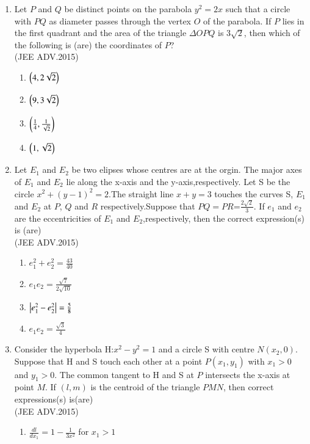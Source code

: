\documentclass[journal,12pt,twocolumn]{IEEEtran}
\theoremstyle{remark}
\begin{document}
\begin{enumerate}
	\item Let $P$ and $Q$ be distinct points on the parabola $y^2=2x$ such 
		that a circle with $PQ$ as diameter passes through the vertex
		$O$ of the parabola. If $P$ lies in the first quadrant and the area
		of the triangle  \(\Delta \)$OPQ$ is 3$\sqrt{2}$, then which of the following is
		(are) the coordinates of $P$? \\ 
		\hfill(JEE ADV.2015)
		\\
		\begin{enumerate}
			\item $ \left(4,2\sqrt{2}\right)$
			\item $\left(9,3\sqrt{2}\right)$
			\item $ \left(\frac{1}{4},\frac{1}{\sqrt{2}}\right)$
			\item  $ \left(1,\sqrt{2}\right)$
		\end{enumerate}
	\item Let $ E_1$  and $ E_2$ be two elipses whose centres are at the orgin.
              The major axes of $E_1$ and $ E_2$ lie along the x-axis and the
              y-axis,respectively. Let S be the circle $x^2+(y-1)^2=2$.The
		straight line $x+y=3$ touches the curves S, $E_1$ and $E_2$ at $P$, $Q$
		and $R$ respectively.Suppose that $PQ=PR$=$\frac{2\sqrt{2}}{3}$. If $e_1$ and
              $e_2$ are the eccentricities of $E_1$ and $E_2$,respectively, then the 
              correct expression(s) is (are) \\
		\hfill(JEE ADV.2015)
		\\
		\begin{enumerate}
			\item $e_1^2+e_2^2=\frac{43}{40}$
			\item $e_1e_2=\frac{\sqrt{7}}{2\sqrt{10}}$
			\item $\left\vert e_1^2-e_2^2\right\vert=\frac{5}{8}$
			\item $e_1e_2=\frac{\sqrt{3}}{4}$ 
		\end{enumerate}
	\item Consider the hyperbola H:$x^2-y^2=1$ and a circle S with 
		centre $N(x_2,0)$. Suppose that H and S touch each other at a 
	      point $P(x_1,y_1)$ with $x_1>0$ and $y_1>0$. The common tangent to H and S at $P$ intersects the x-axis at point $M$. If ${(l,m)}$ is the centroid of the triangle $PMN$, then correct expressions(s) is(are) \\
	      \hfill(JEE ADV.2015)
	      \\
	      \begin{enumerate}
		      \item $\frac{dl}{dx_1}=1-\frac{1}{3x^2}$ for $x_1>1$ 

\end{enumerate}
\end{enumerate}
\end{document}
